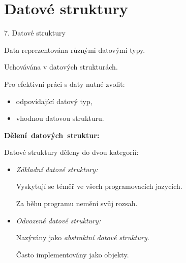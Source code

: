 \documentclass[czech]{beamer}
\begin{document}
\section{Datové struktury}
\begin{frame}{7. Datové struktury}

{\scriptsize Data reprezentována různými datovými typy.}{\scriptsize\par}

{\scriptsize Uchovávána v datových strukturách.}{\scriptsize\par}

{\scriptsize\medskip{}
}{\scriptsize\par}

{\scriptsize Pro efektivní práci s daty nutné zvolit:}{\scriptsize\par}
\begin{itemize}
\item {\scriptsize odpovídající datový typ,}{\scriptsize\par}
\item {\scriptsize vhodnou datovou strukturu.}{\scriptsize\par}
\end{itemize}
{\scriptsize\medskip{}
}{\scriptsize\par}

{\scriptsize\textbf{Dělení~datových~struktur:}}{\scriptsize\par}

{\scriptsize Datové struktury děleny do dvou kategorií:}{\scriptsize\par}
\begin{itemize}
\item {\scriptsize\emph{Základní datové struktury: }}

{\scriptsize\par}{\scriptsize Vyskytují se téměř ve všech programovacích jazycích. }{\scriptsize\par}

{\scriptsize Za běhu programu nemění svůj rozsah.}{\scriptsize\par}
\item {\scriptsize\emph{Odvozené datové struktury:}}

{\scriptsize\par}{\scriptsize Nazývány jako }{\scriptsize\emph{abstraktní datové struktury. }}{\scriptsize\par}

{\scriptsize Často implementovány jako objekty. }{\scriptsize\par}


\end{itemize}
\end{frame}
\end{document}
